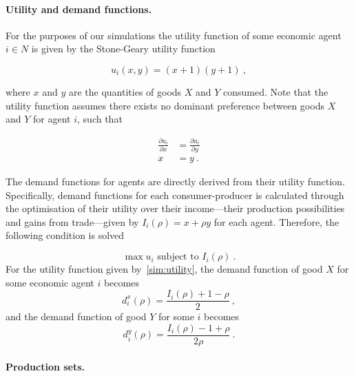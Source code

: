 \paragraph{Utility and demand functions.}

For the purposes of our simulations the utility function of some economic agent $i \in N$ is given by the Stone-Geary utility function

\begin{equation} \label{sim:utility}
u_{i}(x,y) = (x + 1)(y + 1)~,
\end{equation}

where $x$ and $y$ are the quantities of goods $X$ and $Y$ consumed. Note that the utility function assumes there exists no dominant preference between goods $X$ and $Y$ for agent $i$, such that

\begin{align*}
\frac{\partial u_{i}}{\partial x} &= \frac{\partial u_{i}}{\partial y} \\
x &= y~.
\end{align*}

The demand functions for agents are directly derived from their utility function. Specifically, demand functions for each consumer-producer is calculated through the optimisation of their utility over their income---their production possibilities and gains from trade---given by $I_{i}(\rho) = x + \rho y$ for each agent. Therefore, the following condition is solved

\begin{equation}
\max u_{i} \mbox{ subject to } I_{i}(\rho)~.
\end{equation}
For the utility function given by~\ref{sim:utility}, the demand function of good $X$ for some economic agent $i$ becomes
\begin{equation}
d_{i}^{x} (\rho) = \frac{I_{i}(\rho) + 1 - \rho}{2}~,
\end{equation}
and the demand function of good $Y$ for some $i$ becomes
\begin{equation}
d_{i}^{y} (\rho) = \frac{I_{i}(\rho) - 1 + \rho}{2 \rho}~.
\end{equation}

\paragraph{Production sets.}

